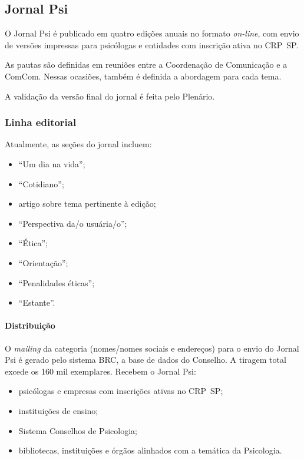 \subsection{Jornal Psi}

O Jornal Psi é publicado em quatro edições anuais no formato
\emph{on-line}, com envio de versões impressas para psicólogas e
entidades com inscrição ativa no CRP~SP.

As pautas são definidas em reuniões entre a Coordenação de Comunicação e
a ComCom. Nessas ocasiões, também é definida a abordagem para cada tema.

A validação da versão final do jornal é feita pelo Plenário.

\subsubsection{Linha editorial}

Atualmente, as seções do jornal incluem:

\begin{itemize}
  \item
        ``Um dia na vida'';
  \item
        ``Cotidiano'';
  \item
        artigo sobre tema pertinente à edição;
  \item
        ``Perspectiva da/o usuária/o'';
  \item
        ``Ética'';
  \item
        ``Orientação'';
  \item
        ``Penalidades éticas'';
  \item
        ``Estante''.
\end{itemize}

\paragraph{Distribuição}

O \emph{mailing} da categoria (nomes/nomes sociais e endereços) para o
envio do Jornal Psi é gerado pelo sistema BRC, a base de dados do
Conselho. A tiragem total excede os 160 mil exemplares. Recebem o Jornal
Psi:

\begin{itemize}
  \item
        psicólogas e empresas com inscrições ativas no CRP~SP;
  \item
        instituições de ensino;
  \item
        Sistema Conselhos de Psicologia;
  \item
        bibliotecas, instituições e órgãos alinhados com a temática da
        Psicologia.
\end{itemize}

